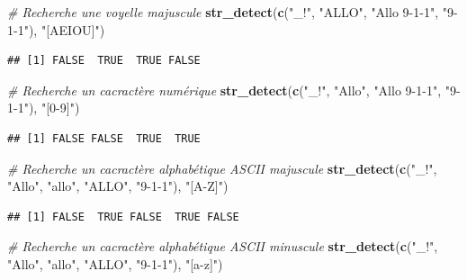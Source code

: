 \documentclass[
  11pt,
]{book}
\newenvironment{Shaded}{\begin{snugshade}}{\end{snugshade}}
\newcommand{\CommentTok}[1]{\textcolor[rgb]{0.56,0.35,0.01}{\textit{#1}}}
\newcommand{\KeywordTok}[1]{\textcolor[rgb]{0.13,0.29,0.53}{\textbf{#1}}}
\newcommand{\NormalTok}[1]{#1}
\newcommand{\StringTok}[1]{\textcolor[rgb]{0.31,0.60,0.02}{#1}}
\numberwithin{equation}{section}
\numberwithin{countremarque}{section}
\begin{document}
\begin{Shaded}
\begin{Highlighting}[]
\CommentTok{\# Recherche une voyelle majuscule}
\KeywordTok{str\_detect}\NormalTok{(}\KeywordTok{c}\NormalTok{(}\StringTok{"\_!"}\NormalTok{, }\StringTok{"ALLO"}\NormalTok{, }\StringTok{"Allo 9{-}1{-}1"}\NormalTok{, }\StringTok{"9{-}1{-}1"}\NormalTok{), }\StringTok{"[AEIOU]"}\NormalTok{)}
\end{Highlighting}
\end{Shaded}

\begin{lstlisting}
## [1] FALSE  TRUE  TRUE FALSE
\end{lstlisting}

\begin{Shaded}
\begin{Highlighting}[]
\CommentTok{\# Recherche un cacractère numérique}
\KeywordTok{str\_detect}\NormalTok{(}\KeywordTok{c}\NormalTok{(}\StringTok{"\_!"}\NormalTok{, }\StringTok{"Allo"}\NormalTok{, }\StringTok{"Allo 9{-}1{-}1"}\NormalTok{, }\StringTok{"9{-}1{-}1"}\NormalTok{), }\StringTok{"[0{-}9]"}\NormalTok{)}
\end{Highlighting}
\end{Shaded}

\begin{lstlisting}
## [1] FALSE FALSE  TRUE  TRUE
\end{lstlisting}

\begin{Shaded}
\begin{Highlighting}[]
\CommentTok{\# Recherche un cacractère alphabétique ASCII majuscule}
\KeywordTok{str\_detect}\NormalTok{(}\KeywordTok{c}\NormalTok{(}\StringTok{"\_!"}\NormalTok{, }\StringTok{"Allo"}\NormalTok{, }\StringTok{"allo"}\NormalTok{, }\StringTok{"ALLO"}\NormalTok{, }\StringTok{"9{-}1{-}1"}\NormalTok{), }\StringTok{"[A{-}Z]"}\NormalTok{)}
\end{Highlighting}
\end{Shaded}

\begin{lstlisting}
## [1] FALSE  TRUE FALSE  TRUE FALSE
\end{lstlisting}

\begin{Shaded}
\begin{Highlighting}[]
\CommentTok{\# Recherche un cacractère alphabétique ASCII minuscule}
\KeywordTok{str\_detect}\NormalTok{(}\KeywordTok{c}\NormalTok{(}\StringTok{"\_!"}\NormalTok{, }\StringTok{"Allo"}\NormalTok{, }\StringTok{"allo"}\NormalTok{, }\StringTok{"ALLO"}\NormalTok{, }\StringTok{"9{-}1{-}1"}\NormalTok{), }\StringTok{"[a{-}z]"}\NormalTok{)}
\end{Highlighting}
\end{Shaded}
\end{document}
